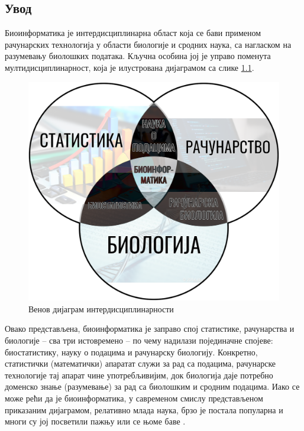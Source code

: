 \documentclass[12pt,oneside]{memoir}
\begin{document}
\begin{CJK}{UTF8}{ipxm}
\frontmatter
\naslovna
\komisija
\apstrakt
\tableofcontents*

\mainmatter

\chapter{Увод}
Биоинформатика је интердисциплинарна област која се бави применом рачунарских технологија у области биологије и сродних наука, са нагласком на разумевању биолошких података. Кључна особина јој је управо поменута мултидисциплинарност, која је илустрована дијаграмом са слике \ref{fig:venn}.

\begin{figure}[H]
  \centering
  \includegraphics[width=.75\textwidth]{bioinformatika.png}
  \caption{Венов дијаграм интердисциплинарности \cite{venn}}
  \label{fig:venn}
\end{figure}

Овако представљена, биоинформатика је заправо спој статистике, рачунарства и биологије -- сва три истовремено -- по чему надилази појединачне спојеве: биостатистику, науку о подацима и рачунарску биологију. Конкретно, статистички (математички) апаратат служи за рад са подацима, рачунарске технологије тај апарат чине употребљивијим, док биологија даје потребно доменско знање (разумевање) за рад са биолошким и сродним подацима. Иако се може рећи да је биоинформатика, у савременом смислу представљеном приказаним дијаграмом, релативно млада наука, брзо је постала популарна и многи су јој посветили пажњу или се њоме баве \cite{ufpr, cmero2015, fauziyyah2019}.


\end{CJK}
\end{document}
